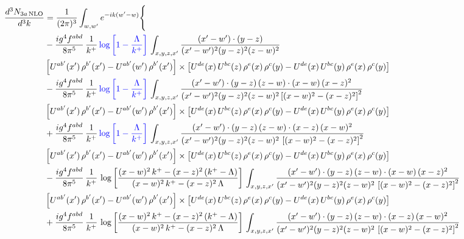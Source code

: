 \documentclass[9pt]{article}
\newcommand{\new}[1]{{\color{blue}#1}}
\numberwithin{equation}{section}
\begin{document}
\begin{align}
\frac{d^{3}N_{3a\,\rm NLO}}{d^{3}k} & =\frac{1}{(2\pi)^{3}}\int_{w,w'}e^{-ik(w'-w)}\Bigg\{\notag \\ &  -\frac{ig^{4}f^{abd}}{8\pi^{5}}\,\frac{1}{k^{+}}\, \new{\log{\left[1-\frac{\Lambda}{k^{+}}\right]}}\,\int_{x,y,z,x'}
\frac{(x'-w')\cdot(y-z)}{(x'-w')^{2}(y-z)^{2}(z-w)^{2}}\notag \\ & \left[U^{ab'}(x')\,\rho^{b'}(x')-U^{ab'}(w')\, \rho^{b'}(x')\right]\times \left[U^{de}(x)\,U^{bc}(z)\, \rho^{e}(x)\,\rho^{c}(y)-U^{de}(x)\,U^{bc}(y)\,\rho^{e}(x)\,\rho^{c}(y)\right]\notag \\ & -\frac{ig^{4}f^{abd}}{8\pi^{5}}\,\frac{1}{k^{+}}\, \new{\log{\left[1-\frac{\Lambda}{k^{+}}\right]}}\,\int_{x,y,z,x'}
\frac{(x'-w')\cdot(y-z)\,(z-w)\cdot(x-w)\,(x-z)^{2}}{(x'-w')^{2}(y-z)^{2}(z-w)^{2}\left[(x-w)^{2}-(x-z)^{2}\right]^{2}}\notag \\ & \left[U^{ab'}(x')\,\rho^{b'}(x')-U^{ab'}(w')\, \rho^{b'}(x')\right]\times \left[U^{de}(x)\,U^{bc}(z)\, \rho^{e}(x)\,\rho^{c}(y)-U^{de}(x)\,U^{bc}(y)\,\rho^{e}(x)\,\rho^{c}(y)\right]\notag \\ & +\frac{ig^{4}f^{abd}}{8\pi^{5}}\,\frac{1}{k^{+}}\, \new{\log{\left[1-\frac{\Lambda}{k^{+}}\right]}}\,\int_{x,y,z,x'}
\frac{(x'-w')\cdot(y-z)\,(z-w)\cdot(x-z)\,(x-w)^{2}}{(x'-w')^{2}(y-z)^{2}(z-w)^{2}\,\left[(x-w)^{2}-(x-z)^{2}\right]^{2}}\notag \\ & \left[U^{ab'}(x')\,\rho^{b'}(x')-U^{ab'}(w')\, \rho^{b'}(x')\right]\times \left[U^{de}(x)\,U^{bc}(z)\, \rho^{e}(x)\,\rho^{c}(y)-U^{de}(x)\,U^{bc}(y)\,\rho^{e}(x)\,\rho^{c}(y)\right]\notag \\ & 
-\frac{ig^{4}f^{abd}}{8\pi^{5}}\,\frac{1}{k^{+}}\,\log{\left[\frac{(x-w)^{2}\,k^{+}-(x-z)^{2}\,(k^{+}-\Lambda)}{(x-w)^{2}\,k^{+}-(x-z)^{2}\,\Lambda}\right]}\,\int_{x,y,z,x'}
\frac{(x'-w')\cdot(y-z)\,(z-w)\cdot(x-w)\,(x-z)^{2}}{(x'-w')^{2}(y-z)^{2}(z-w)^{2}\,\left[(x-w)^{2}-(x-z)^{2}\right]^{2}}\notag \\ & \left[U^{ab'}(x')\,\rho^{b'}(x')-U^{ab'}(w')\, \rho^{b'}(x')\right]\times \left[U^{de}(x)\,U^{bc}(z)\, \rho^{e}(x)\,\rho^{c}(y)-U^{de}(x)\,U^{bc}(y)\,\rho^{e}(x)\,\rho^{c}(y)\right]\notag \\ & +\frac{ig^{4}f^{abd}}{8\pi^{5}}\,\frac{1}{k^{+}}\,\log{\left[\frac{(x-w)^{2}\,k^{+}-(x-z)^{2}\,(k^{+}-\Lambda)}{(x-w)^{2}\,k^{+}-(x-z)^{2}\,\Lambda}\right]}\,\int_{x,y,z,x'}
\frac{(x'-w')\cdot(y-z)\,(z-w)\cdot(x-z)\,(x-w)^{2}}{(x'-w')^{2}(y-z)^{2}(z-w)^{2}\,\left[(x-w)^{2}-(x-z)^{2}\right]^{2}}\notag \\ 

\end{align}
\end{document}
